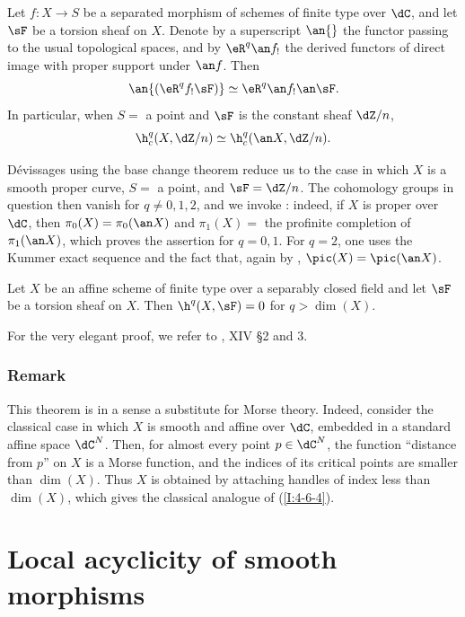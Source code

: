 \begin{theorem}\label{I:4-6-3}
Let $f:X\to S$ be a separated morphism of schemes of finite type over
$\dC$, and let $\sF$ be a torsion sheaf on $X$. Denote by a superscript
$\an{}$ the functor passing to the usual topological spaces, and by
$\eR^q\an f_!$ the derived functors of direct image with proper support
under $\an f$. Then
\[
  \an{(\eR^q f_! \sF)} \simeq \eR^q \an f_! \an \sF \text{.}
\]
In particular, when $S=$ a point and $\sF$ is the constant sheaf
$\dZ/n$,
\[
  \h_c^q(X,\dZ/n) \simeq \h_c^q(\an X,\dZ/n)\text{.}
\]
\end{theorem}

Dévissages using the base change theorem reduce us to the case in which
$X$ is a smooth proper curve, $S=$ a point, and $\sF=\dZ/n$. The
cohomology groups in question then vanish for $q\ne0,1,2$, and we invoke
: indeed, if $X$ is proper over $\dC$, then
$\pi_0(X)=\pi_0(\an X)$ and $\pi_1(X)=$ the profinite completion of
$\pi_1(\an X)$, which proves the assertion for $q=0,1$. For $q=2$,
one uses the Kummer exact sequence and the fact that, again by
, $\pic(X)=\pic(\an X)$.

\begin{theorem}\label{I:4-6-4}
Let $X$ be an affine scheme of finite type over a separably closed field
and let $\sF$ be a torsion sheaf on $X$. Then
$\h^q(X,\sF)=0$ for $q>\dim(X)$.
\end{theorem}

For the very elegant proof, we refer to , XIV \S 2 and 3.

\subsubsection{Remark}\label{I:4-6-5}

This theorem is in a sense a substitute for Morse theory. Indeed, consider
the classical case in which $X$ is smooth and affine over $\dC$, embedded
in a standard affine space $\dC^N$. Then, for almost every point
$p\in\dC^N$, the function “distance from $p$” on $X$ is a Morse
function, and the indices of its critical points are smaller than
$\dim(X)$. Thus $X$ is obtained by attaching handles of index less than
$\dim(X)$, which gives the classical analogue of (\ref{I:4-6-4}).

\section{Local acyclicity of smooth morphisms}\label{I:5}

